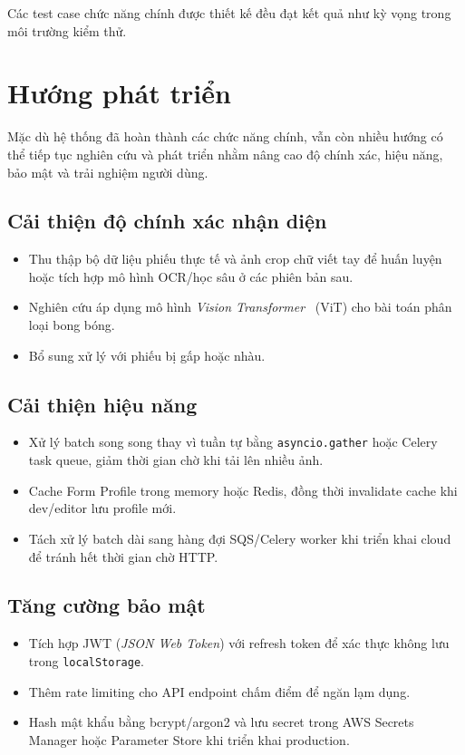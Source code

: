 Các test case chức năng chính được thiết kế đều đạt kết quả như kỳ vọng trong môi trường kiểm thử.

\section{Hướng phát triển}

Mặc dù hệ thống đã hoàn thành các chức năng chính, vẫn còn nhiều hướng có thể tiếp tục nghiên cứu và phát triển nhằm nâng cao độ chính xác, hiệu năng, bảo mật và trải nghiệm người dùng.

\subsection{Cải thiện độ chính xác nhận diện}

\begin{itemize}
    \item Thu thập bộ dữ liệu phiếu thực tế và ảnh crop chữ viết tay để huấn luyện hoặc tích hợp mô hình OCR/học sâu ở các phiên bản sau.
    \item Nghiên cứu áp dụng mô hình \textit{Vision Transformer}~\cite{vit} (ViT) cho bài toán phân loại bong bóng.
    \item Bổ sung xử lý với phiếu bị gấp hoặc nhàu.
\end{itemize}

\subsection{Cải thiện hiệu năng}

\begin{itemize}
    \item Xử lý batch song song thay vì tuần tự bằng \texttt{asyncio.gather} hoặc Celery task queue, giảm thời gian chờ khi tải lên nhiều ảnh.
    \item Cache Form Profile trong memory hoặc Redis, đồng thời invalidate cache khi dev/editor lưu profile mới.
    \item Tách xử lý batch dài sang hàng đợi SQS/Celery worker khi triển khai cloud để tránh hết thời gian chờ HTTP.
\end{itemize}

\subsection{Tăng cường bảo mật}

\begin{itemize}
    \item Tích hợp JWT (\textit{JSON Web Token}) với refresh token để xác thực không lưu trong \texttt{localStorage}.
    \item Thêm rate limiting cho API endpoint chấm điểm để ngăn lạm dụng.
    \item Hash mật khẩu bằng bcrypt/argon2 và lưu secret trong AWS Secrets Manager hoặc Parameter Store khi triển khai production.
\end{itemize}

